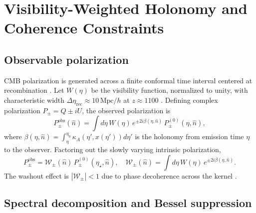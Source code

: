\documentclass[12pt]{article}
\theoremstyle{definition}
\newcommand{\kA}{\kappa_A}
\newcommand{\Wrec}{\Delta\eta_{\mathrm{rec}}}
\newcommand{\etastar}{\eta_\star}
\newcommand{\etaobs}{\eta_0}
\newcommand{\Wpm}{\mathcal{W}_\pm}
\begin{document}
\section{Visibility-Weighted Holonomy and Coherence Constraints}
\label{sec:visibility}

\subsection{Observable polarization}

CMB polarization is generated across a finite conformal time interval
centered at recombination \cite{Zaldarriaga1998,Hu1997,Kosowsky1996}.
Let $W(\eta)$ be the visibility function, normalized to unity, with
characteristic width $\Wrec\approx10\,\mathrm{Mpc}/h$ at
$z\approx1100$ \cite{Weinberg2008}.
Defining complex polarization $P_\pm=Q\pm iU$, the observed polarization is
\begin{equation}
  P_\pm^{\mathrm{obs}}(\hat{n})
  = \int d\eta\,W(\eta)\,
    e^{\pm 2i\beta(\eta,\hat{n})}\,P_\pm^{(0)}(\eta,\hat{n}),
  \label{eq:Pobs}
\end{equation}
where $\beta(\eta,\hat{n})=\int_\eta^{\etaobs}\kA(\eta',x(\eta'))d\eta'$
is the holonomy from emission time $\eta$ to the observer.
Factoring out the slowly varying intrinsic polarization,
\begin{equation}
  P_\pm^{\mathrm{obs}} = \Wpm(\hat{n})\,P_\pm^{(0)}(\etastar,\hat{n}),
  \quad
  \Wpm(\hat{n}) = \int d\eta\,W(\eta)\,e^{\pm2i\beta(\eta,\hat{n})}.
  \label{eq:Wpm}
\end{equation}
The washout effect is $|\Wpm|<1$ due to phase decoherence across
the kernel \cite{Fujita2021,Sherfield2023,Murai2023}.

\subsection{Spectral decomposition and Bessel suppression}
\end{document}
